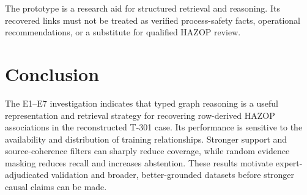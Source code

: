 \begin{constraint}
The prototype is a research aid for structured retrieval and reasoning.
Its recovered links must not be treated as verified process-safety facts,
operational recommendations, or a substitute for qualified HAZOP review.
\end{constraint}

\section{Conclusion}

The E1--E7 investigation indicates that typed graph reasoning is a useful
representation and retrieval strategy for recovering row-derived HAZOP
associations in the reconstructed T-301 case. Its performance is sensitive
to the availability and distribution of training relationships. Stronger
support and source-coherence filters can sharply reduce coverage, while
random evidence masking reduces recall and increases abstention. These
results motivate expert-adjudicated validation and broader, better-grounded
datasets before stronger causal claims can be made.

